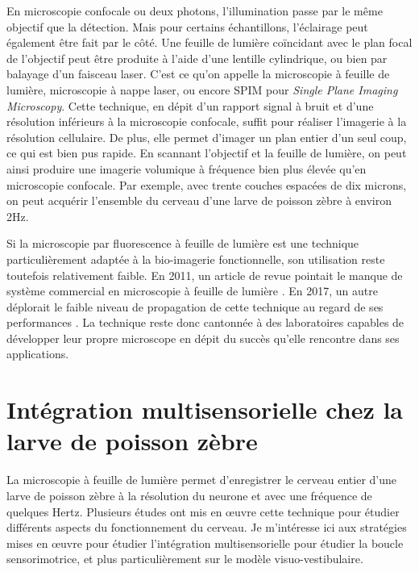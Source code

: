 En microscopie confocale ou deux photons, l'illumination passe par le même objectif que la détection. Mais pour certains échantillons, l'éclairage peut également être fait par le côté. Une feuille de lumière coïncidant avec le plan focal de l'objectif peut être produite à l'aide d'une lentille cylindrique, ou bien par balayage d'un faisceau laser. C'est ce qu'on appelle la microscopie à feuille de lumière, microscopie à nappe laser, ou encore SPIM pour \emph{Single Plane Imaging Microscopy}. Cette technique, en dépit d'un rapport signal à bruit et d'une résolution inférieurs à la microscopie confocale, suffit pour réaliser l'imagerie à la résolution cellulaire. De plus, elle permet d'imager un plan entier d'un seul coup, ce qui est bien pus rapide. En scannant l'objectif et la feuille de lumière, on peut ainsi produire une imagerie volumique à fréquence bien plus élevée qu'en microscopie confocale. Par exemple, avec trente couches espacées de dix microns, on peut acquérir l'ensemble du cerveau d'une larve de poisson zèbre à environ 2Hz.

Si la microscopie par fluorescence à feuille de lumière est une technique particulièrement adaptée à la bio-imagerie fonctionnelle, son utilisation reste toutefois relativement faible. En 2011, un article de revue pointait le manque de système commercial en microscopie à feuille de lumière \cite{santi_light_2011}. En 2017, un autre déplorait le faible niveau de propagation de cette technique au regard de ses performances \cite{power_guide_2017}. La technique reste donc cantonnée à des laboratoires capables de développer leur propre microscope en dépit du succès qu'elle rencontre dans ses applications.


\section{Intégration multisensorielle chez la larve de poisson zèbre}

La microscopie à feuille de lumière permet d'enregistrer le cerveau entier d'une larve de poisson zèbre à la résolution du neurone et avec une fréquence de quelques Hertz. Plusieurs études ont mis en œuvre cette technique pour étudier différents aspects du fonctionnement du cerveau. Je m'intéresse ici aux stratégies mises en œuvre pour étudier l'intégration multisensorielle pour étudier la boucle sensorimotrice, et plus particulièrement sur le modèle visuo-vestibulaire.

